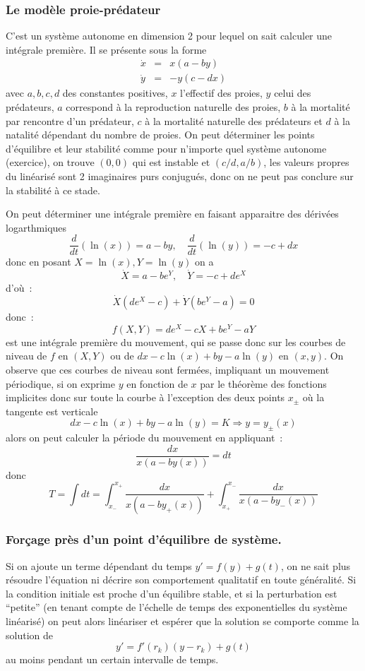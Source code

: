 \documentclass[a4paper,11pt]{article}
\begin{document}
\begin{giacjshere}
\subsubsection{Le mod\`ele proie-pr\'edateur}
C'est un syst\`eme autonome en dimension 2 pour lequel on sait
calculer une int\'egrale premi\`ere. Il se pr\'esente sous la forme
\begin{eqnarray*}
\dot{x}&=&x(a-by)\\
\dot{y}&=&-y(c-dx)
\end{eqnarray*}
avec $a,b,c,d$ des constantes positives, $x$ l'effectif des proies,
$y$ celui des pr\'edateurs,
$a$ correspond \`a la reproduction naturelle des proies, 
$b$ \`a la mortalit\'e par
rencontre d'un pr\'edateur, $c$ \`a la mortalit\'e naturelle
des pr\'edateurs et $d$ \`a la natalit\'e d\'ependant du nombre de
proies.
On peut d\'eterminer les points d'\'equilibre et leur stabilit\'e
comme pour n'importe quel syst\`eme autonome (exercice),
on trouve $(0,0)$  qui est instable et $(c/d,a/b)$, les valeurs propres
du lin\'earis\'e 
sont 2 imaginaires purs conjugu\'es, donc on ne peut pas conclure sur
la stabilit\'e \`a ce stade.

On peut d\'eterminer une int\'egrale premi\`ere en faisant apparaitre
des d\'eriv\'ees logarthmiques
$$ \frac{d}{dt}(\ln(x))=a-by, \quad \frac{d}{dt}(\ln(y))=-c+dx $$
donc en posant $X=\ln(x), Y=\ln(y)$ on a
$$ \dot{X}=a-be^Y, \quad \dot{Y}=-c+de^X$$
d'o\`u~:
$$ \dot{X} (de^X-c) + \dot{Y}(be^Y-a)=0$$
donc~:
$$ f(X,Y)=de^X-cX+be^Y-aY$$
est une int\'egrale premi\`ere du mouvement, qui se passe donc sur
les courbes de niveau de $f$ en $(X,Y)$ ou de $dx-c\ln(x)+by-a\ln(y)$
en $(x,y)$. On observe que ces courbes de niveau sont ferm\'ees, 
impliquant un mouvement p\'eriodique, si on exprime $y$ en fonction
de $x$ par le th\'eor\`eme des fonctions implicites donc sur toute la
courbe \`a l'exception des deux points $x_\pm$ o\`u la tangente est verticale
$$dx-c\ln(x)+by-a\ln(y)=K \Rightarrow y=y_{\pm}(x)$$
alors on peut calculer la p\'eriode du mouvement en appliquant~:
$$ \frac{dx}{x(a-by(x))}=dt$$
donc
$$ T=\int dt = \int_{x_-}^{x_+}  \frac{dx}{x(a-by_+(x))}
+ \int_{x_+}^{x_-}  \frac{dx}{x(a-by_-(x))}
$$


\subsubsection{For\c{c}age pr\`es d'un point d'\'equilibre de syst\`eme.}
Si on ajoute un terme d\'ependant du temps $y'=f(y)+g(t)$,
on ne sait plus r\'esoudre l'\'equation ni d\'ecrire
son comportement qualitatif en toute g\'en\'eralit\'e. Si
la condition initiale est proche d'un \'equilibre stable, et si
la perturbation est ``petite'' (en tenant compte de l'\'echelle
de temps des exponentielles du syst\`eme lin\'earis\'e)
on peut alors lin\'eariser et esp\'erer que
la solution se comporte comme la solution de
$$y'=f'(r_k)(y-r_k) + g(t)$$
au moins pendant un certain intervalle de temps.


\end{giacjshere}
\end{document}
